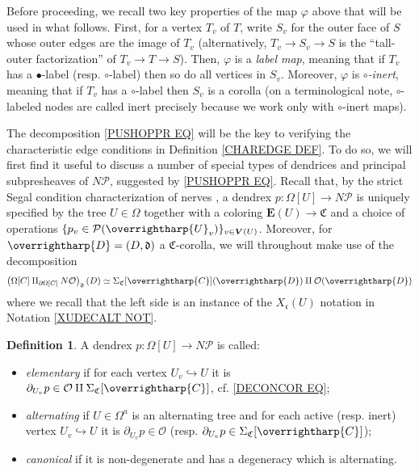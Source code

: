\documentclass[a4paper,10pt
,draft
]{article}%
\numberwithin{equation}{section}
\numberwithin{figure}{section}
\theoremstyle{definition} %
\newtheorem{definition}[equation]{Definition}%
\newcommand{\vect}[1]{\text{\overrightharp{\ensuremath{#1}}}}
\renewcommand{\O}{\ensuremath{\mathcal O}}
\newcommand{\1}{\ensuremath{\mathbbm 1}}%
\begin{document}
Before proceeding, we recall two key properties of the map $\varphi$ above that will be used in what follows.
First, for a vertex $T_v$ of $T$, write $S_v$ for the outer face of $S$ whose outer edges are the image of $T_v$
(alternatively,
$T_v \to S_v \to S$ is the ``tall-outer factorization''
of $T_v \to T \to S$).
Then, $\varphi$ is a \emph{label map},
meaning that if $T_v$ has a $\bullet$-label 
(resp. $\circ$-label) then so do all vertices in $S_v$.
Moreover, $\varphi$ is \emph{$\circ$-inert}, 
meaning that if $T_v$ has a $\circ$-label then $S_v$ is a corolla
(on a terminological note, $\circ$-labeled nodes are called inert precisely because we work only with $\circ$-inert maps).


The decomposition \eqref{PUSHOPPR EQ}
will be the key to verifying the 
characteristic edge conditions in Definition \ref{CHAREDGE DEF}.
To do so, we will first find it useful to discuss a number of special types of dendrices and principal subpresheaves of $N \mathcal{P}$, suggested by \eqref{PUSHOPPR EQ}.
%
Recall that, by the strict Segal condition characterization of nerves \cite[Cor. 2.6]{CM13a},
a dendrex $p \colon \Omega[U] \to N \mathcal{P}$
is uniquely specified by the tree $U \in \Omega$ together with
a coloring
$\boldsymbol{E}(U) \to \mathfrak{C}$
and a choice of operations
$\{p_v \in \mathcal{P}(\vect{U}_v)\}_{v \in \boldsymbol{V}(U)}$.
Moreover,
for $\vect{D} = (D,\mathfrak{d})$ a $\mathfrak{C}$-corolla,
we will throughout make use of the decomposition 
\begin{equation}\label{DECONCOR EQ}
	\left(
	\Omega[C] \amalg_{\partial \Omega[C]} N \O
	\right)_{\mathfrak{d}} (D)
\simeq
	\Sigma_{\mathfrak{C}}[\vect{C}](\vect{D}) \amalg \O(\vect{D})
\end{equation}
where we recall that the left side 
is an instance of the $X_{\mathfrak{c}}(U)$ notation
in Notation \ref{XUDECALT NOT}.

\begin{definition}\label{DENDTYPES DEF}
	A dendrex $p\colon \Omega[U] \to N \mathcal{P}$ 
	is called:
	\begin{itemize}
		\item \emph{elementary} if for each vertex $U_v \hookrightarrow U$
		it is $ \partial_{U_v} p \in \mathcal{O} \amalg \Sigma_{\mathfrak{C}}[\vect{C}]$, 
		cf. \eqref{DECONCOR EQ};
		\item \emph{alternating} if $U \in \Omega^a$ is an alternating tree
		and for each active (resp. inert) vertex 
		$U_v \hookrightarrow U$ it is
		$\partial_{U_v} p \in \O$
		(resp. $ \partial_{U_v} p \in \Sigma_{\mathfrak{C}}[\vect{C}]$);
		\item \emph{canonical} if it is non-degenerate and has a degeneracy which is alternating.
	\end{itemize}
\end{definition}
\end{document}
